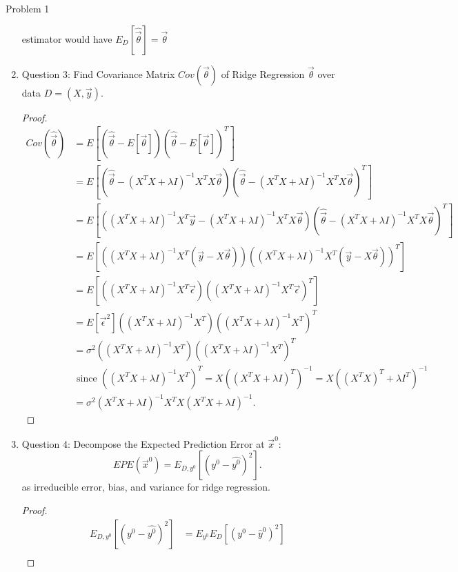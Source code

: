 \documentclass[a4paper]{article}
\begin{document}
\begin{note}{Problem 1}
\begin{enumerate}
\begin{note}
      estimator would have $E_D[\hat{\vec{\theta}}] = \vec{\theta}$
    \end{note}
  \item Question 3: Find Covariance Matrix $Cov(\vec{\theta})$ of Ridge Regression $\vec{\theta}$ over data $D = (X, \vec{y})$.
    \begin{proof}
      \begin{align*}
        Cov(\hat{\vec{\theta}}) &= E[(\hat{\vec{\theta}} - E[\vec{\theta}])(\hat{\vec{\theta}} - E[\vec{\theta}])^T] \\
                                &=  E[(\hat{\vec{\theta}} - (X^T X + \lambda I)^{-1}X^T X \vec{\theta}) 
                                (\hat{\vec{\theta}} -  (X^T X + \lambda I)^{-1}X^T X \vec{\theta})^T] \\
                                &= E[((X^TX + \lambda I)^{-1} X^T \vec{y} - (X^T X + \lambda I)^{-1}X^T X \vec{\theta}) 
                                (\hat{\vec{\theta}} - (X^T X + \lambda I)^{-1}X^T X \vec{\theta})^T] \\
                                &= E[((X^TX + \lambda I)^{-1} X^T (\vec{y} - X\vec{\theta}))((X^T X + \lambda I)^{-1}X^T \left(\vec{y} - X\vec{\theta} \right))^T] \\
                                &= E[((X^TX + \lambda I)^{-1} X^T \vec{\epsilon})((X^TX + \lambda I)^{-1}X^T \vec{\epsilon})^T] \\
                                &= E[\vec{\epsilon}^2] ((X^TX + \lambda I)^{-1} X^T) ((X^TX + \lambda I)^{-1} X^T)^T \\ 
                                &= \sigma^2 ((X^TX + \lambda I)^{-1} X^T) ((X^TX + \lambda I)^{-1} X^T)^T \\
                                & \text{ since $((X^TX + \lambda I)^{-1} X^T)^T = X((X^TX + \lambda I)^T)^{-1} = X((X^TX)^T + \lambda I^T)^{-1}$} \\
                                &= \sigma^2  (X^TX + \lambda I)^{-1} X^T X (X^TX + \lambda I)^{-1} 
    .\end{align*}
    \end{proof}
  \item Question 4: Decompose the Expected Prediction Error at $\vec{x}^0$:
     \[
       EPE(\vec{x}^0) = E_{D, y^0} [(y^0 - \hat{y^0})^2]
    .\] as irreducible error, bias, and variance for ridge regression.
    \begin{proof}
      \begin{align*}
        E_{D, y^0} [(y^0 - \hat{y^0})^2] &= E_{y^0} E_D [(y^0 - \hat{y}^0)^2] \\

\end{align*}
\end{proof}
\end{enumerate}
\end{note}
\end{document}
